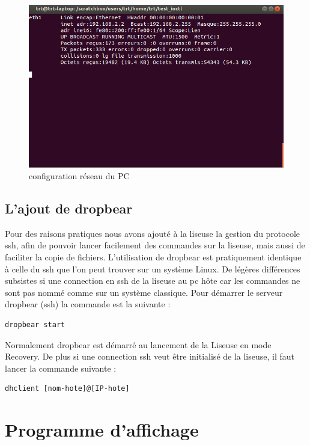 \begin{figure}[]
	\begin{center}
		\includegraphics[scale=0.5]{capt_pc_ifconfig.png}
	\end{center}
	\caption{configuration réseau du PC}
\end{figure}
\clearpage
\subsection{L'ajout de dropbear}
Pour des raisons pratiques nous avons ajouté à la liseuse la gestion du protocole ssh, afin de pouvoir lancer facilement des commandes sur la liseuse, mais aussi de faciliter la copie de fichiers.
L'utilisation de dropbear est pratiquement identique à celle du ssh que l'on peut trouver sur un système Linux. De légères différences subsistes si une connection en ssh de la liseuse au pc hôte car les commandes ne sont pas nommé comme sur un système classique. Pour démarrer le serveur dropbear (ssh) la commande est la suivante : 

\begin{lstlisting}
dropbear start
\end{lstlisting}

Normalement dropbear est démarré au lancement de la Liseuse en mode Recovery. De plus si une connection ssh veut être initialisé de la liseuse, il faut lancer la commande suivante :

\begin{lstlisting}
dhclient [nom-hote]@[IP-hote]
\end{lstlisting}



\section{Programme d'affichage}

